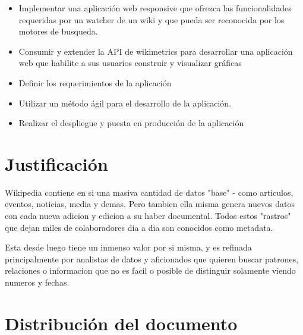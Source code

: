 \begin{itemize}{}{}

    \item Implementar una aplicación web responsive que ofrezca las funcionalidades requeridas por un watcher de un wiki y que pueda ser reconocida por los motores de busqueda.
    \item Consumir y extender la API de wikimetrics para desarrollar una aplicación web que habilite a sus usuarios construir y visualizar gráficas
    \item Definir los requerimientos de la aplicación
    \item Utilizar un método ágil para el desarrollo de la aplicación.
    \item Realizar el despliegue y puesta en producción de la aplicación

\end{itemize}


\section{Justificación}

Wikipedia contiene en si una masiva cantidad de datos "base" - como articulos, eventos, noticias, media y demas. Pero tambien ella misma genera nuevos datos con cada nueva adicion y edicion a su haber documental. Todos estos "rastros" que dejan miles de colaboradores dia a dia son conocidos como metadata.

Esta desde luego tiene un inmenso valor por si misma, y es refinada principalmente por analistas de datos y aficionados que quieren buscar patrones, relaciones o informacion que no es facil o posible de distinguir solamente viendo numeros y fechas.





\section{Distribución del documento}

